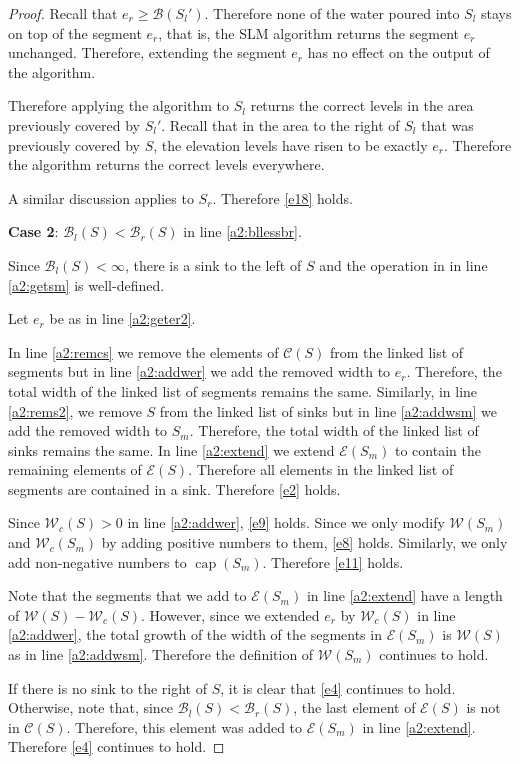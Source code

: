 \documentclass[11pt,a4paper]{article}
\newcommand{\Br}{\mathcal{B}_r}
\newcommand{\Bl}{\mathcal{B}_l}
\newcommand{\B}{\mathcal{B}}
\newcommand{\Wc}{\mathcal{W}_c}
\newcommand{\W}{\mathcal{W}}
\newcommand{\C}{\mathcal{C}}
\newcommand{\E}{\mathcal{E}}
\DeclareMathOperator{\capp}{cap}
\begin{document}
\begin{proof}
Recall that $e_r\ge\B(S_l')$.
Therefore none of the water poured into $S_l$ stays on top of the segment $e_r$, that is, the SLM algorithm returns the segment $e_r$ unchanged.
Therefore, extending the segment $e_r$ has no effect on the output of the algorithm.

Therefore applying the algorithm to $S_l$ returns the correct levels in the area previously covered by $S_l'$.
Recall that in the area to the right of $S_l$ that was previously covered by $S$, the elevation levels have risen to be exactly $e_r$.
Therefore the algorithm returns the correct levels everywhere.

A similar discussion applies to $S_r$.
Therefore \ref{e18} holds.

\textbf{Case 2}: $\Bl(S) < \Br(S)$ in line \ref{a2:bllessbr}.

Since $\Bl(S) < \infty$, there is a sink to the left of $S$ and the operation in
in line \ref{a2:getsm} is well-defined.

Let $e_r$ be as in line \ref{a2:geter2}.

In line \ref{a2:remcs} we remove the elements of $\C(S)$ from the linked list of segments but in line \ref{a2:addwer} we add the removed width to $e_r$.
Therefore, the total width of the linked list of segments remains the same.
Similarly, in line \ref{a2:rems2}, we remove $S$ from the linked list of sinks but in line \ref{a2:addwsm} we add the removed width to $S_m$.
Therefore, the total width of the linked list of sinks remains the same.
In line \ref{a2:extend} we extend $\E(S_m)$ to contain the remaining elements of $\E(S)$.
Therefore all elements in the linked list of segments are contained in a sink.
Therefore \ref{e2} holds.

Since $\Wc(S) > 0$ in line \ref{a2:addwer}, \ref{e9} holds.
Since we only modify $\W(S_m)$ and $\Wc(S_m)$ by adding positive numbers to them, \ref{e8} holds.
Similarly, we only add non-negative numbers to $\capp(S_m)$.
Therefore \ref{e11} holds.

Note that the segments that we add to $\E(S_m)$ in line \ref{a2:extend} have a length of $\W(S) - \Wc(S)$.
However, since we extended $e_r$ by $\Wc(S)$ in line \ref{a2:addwer}, the total growth of the width of the segments in $\E(S_m)$ is $\W(S)$ as in line \ref{a2:addwsm}.
Therefore the definition of $\W(S_m)$ continues to hold.

If there is no sink to the right of $S$, it is clear that \ref{e4} continues to hold.
Otherwise, note that, since $\Bl(S) < \Br(S)$, the last element of $\E(S)$ is not in $\C(S)$.
Therefore, this element was added to $\E(S_m)$ in line \ref{a2:extend}.
Therefore \ref{e4} continues to hold.


\end{proof}
\end{document}

